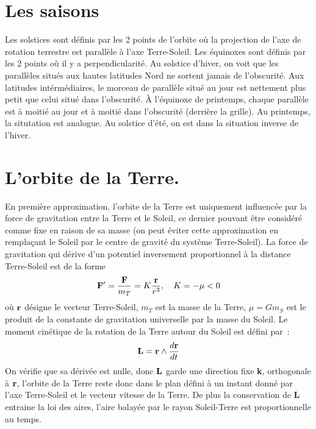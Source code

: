 \documentclass[a4paper,11pt]{book}
\begin{document}
\begin{giacjshere}
\section{Les saisons}
Les solstices sont définis par les 2 points de l'orbite où la projection
de l'axe de rotation terrestre est parallèle à l'axe Terre-Soleil.
Les équinoxes sont définis par les 2 points où il y a perpendicularité.
Au solstice d'hiver, on voit que les parallèles situés aux hautes latitudes
Nord ne sortent jamais de l'obscurité. Aux latitudes intérmédiaires,
le morceau de parallèle situé au jour est nettement plus petit que
celui situé dans l'obscurité.
\`A l'équinoxe de printemps, chaque parallèle est à moitié au jour
et à moitié dans l'obscurité (derrière la grille). Au printemps,
la situtation est analogue.
Au solstice d'été, on est dans la situation inverse de l'hiver.

\pagebreak

\section{L'orbite de la Terre.}
En première approximation, l'orbite de la Terre est uniquement
influencée par la force de gravitation entre la Terre et le Soleil,
ce dernier pouvant être considéré comme fixe en raison de sa masse
(on peut éviter cette approximation en remplaçant le Soleil par
le centre de gravité du système Terre-Soleil).
La force de gravitation qui dérive d'un potentiel inversement
proportionnel à la distance Terre-Soleil est de la forme
\[ {\bf F'}=\frac{{\bf F}}{m_T}= K \frac{\bf r}{r^3}, \quad K=-\mu<0\]
o\`u ${\bf r}$ d\'esigne le vecteur Terre-Soleil, $m_T$ est la masse
de la Terre, $\mu=Gm_S$ est le produit de la constante
de gravitation universelle par la masse du Soleil.
Le moment cinétique de la rotation de la Terre autour du Soleil
est d\'efini par~:
\[ {\bf L} = {\bf r} \wedge \frac{d \bf r}{dt} \]
On v\'erifie que sa d\'eriv\'ee est nulle, donc ${\bf L}$ garde
une direction fixe {\bf k}, orthogonale \`a ${\bf r}$,
l'orbite de la Terre reste donc dans le plan défini \`a un instant
donn\'e par l'axe Terre-Soleil et le vecteur vitesse de la Terre.
De plus la conservation de {\bf L} entraine 
la loi des aires, l'aire balayée par le rayon Soleil-Terre
est proportionnelle au temps.


\end{giacjshere}
\end{document}
